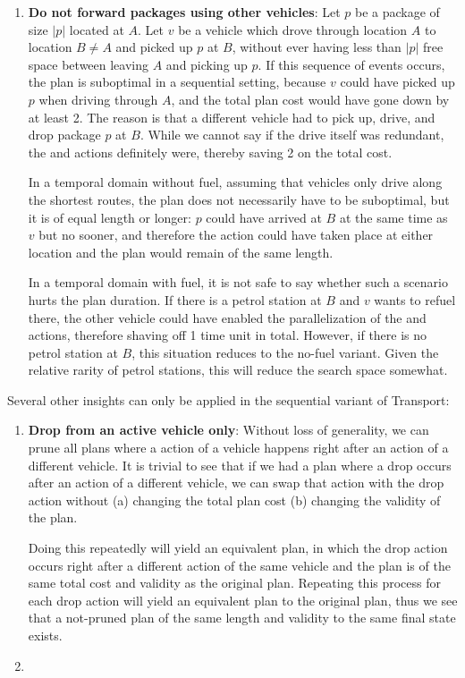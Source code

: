 \begin{enumerate}
\item \textbf{Do not forward packages using other vehicles}:
Let $p$ be a package of size $|p|$ located at $A$.
Let $v$ be a vehicle which drove through location $A$ to location $B \neq A$
and picked up $p$ at $B$,
without ever having less than $|p|$ free space between leaving $A$ and picking up $p$.
If this sequence of events occurs, the plan is suboptimal in a sequential setting, because
$v$ could have picked up $p$ when driving through $A$, and the total plan cost
would have gone down by at least 2. The reason is that a different vehicle had to pick up, drive, and drop package $p$ at $B$.
While we cannot say if the drive itself
was redundant, the \pickup{} and \drop{} actions definitely were, thereby saving
2 on the total cost. 

In a temporal domain without fuel, assuming that vehicles only drive along the shortest routes,
the plan does not necessarily have to be suboptimal, but it
is of equal length or longer: $p$ could have arrived at $B$ at the same time as $v$ but no sooner, and therefore the \pickup{} action could have taken place at either location and the plan would remain of the same length. 

In a temporal domain with fuel, it is not safe to say whether
such a scenario hurts the plan duration. If there is a petrol station at $B$
and $v$ wants to refuel there, the other vehicle could have enabled the parallelization 
of the  and \pickup{} actions, therefore shaving off 1 time unit in total.
However, if there is no petrol
station at $B$, this situation reduces to the no-fuel variant. Given the relative rarity of petrol stations, this will reduce the search space somewhat.
\end{enumerate}
Several other insights can only be applied in the sequential variant of Transport:
\begin{enumerate}
\item \textbf{Drop from an active vehicle only}: Without loss of generality,
we can prune all plans where a \drop{} action of a vehicle happens
right after an action of a different vehicle. It is trivial to see that if we had a plan where a drop
occurs after an action of a different vehicle, we can swap that action with the drop
action without (a) changing the total plan cost (b) changing the validity of the plan.

Doing this repeatedly will yield an equivalent plan, in which the drop action
occurs right after a different action of the same vehicle and the plan is of the same total cost and validity as the original plan. Repeating this process for each drop action will yield an equivalent plan to the original plan, thus we see that a not-pruned plan of the same length and validity to the same final state exists.

\item \textbf{}
\end{enumerate}
